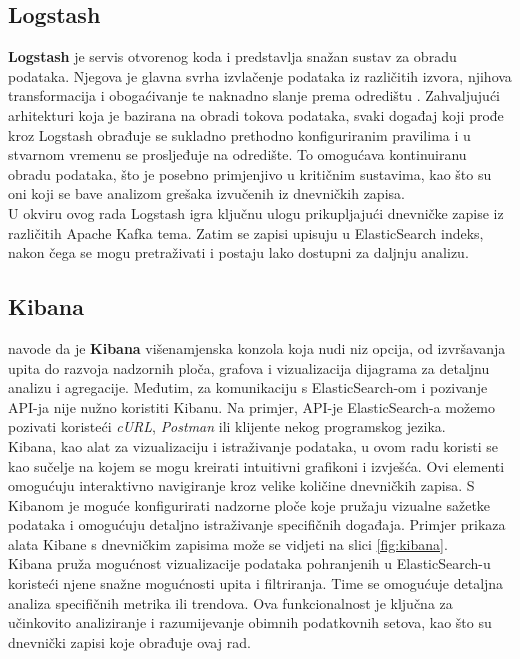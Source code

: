 \documentclass[times, utf8, diplomski]{fer}
\begin{document}
\subsection{Logstash}
\label{sec:logstash}

\textbf{Logstash} je servis otvorenog koda i predstavlja snažan sustav za obradu podataka. Njegova je glavna svrha izvlačenje podataka iz različitih izvora, njihova transformacija i obogaćivanje te naknadno slanje prema odredištu \citep{konda_elasticsearch_2023}. Zahvaljujući arhitekturi koja je bazirana na obradi tokova podataka, svaki događaj koji prođe kroz Logstash obrađuje se sukladno prethodno konfiguriranim pravilima i u stvarnom vremenu se prosljeđuje na odredište. To omogućava kontinuiranu obradu podataka, što je posebno primjenjivo u kritičnim sustavima, kao što su oni koji se bave analizom grešaka izvučenih iz dnevničkih zapisa.\\

U okviru ovog rada Logstash igra ključnu ulogu prikupljajući dnevničke zapise iz različitih Apache Kafka tema. Zatim se zapisi upisuju u ElasticSearch indeks, nakon čega se mogu pretraživati i postaju lako dostupni za daljnju analizu.

\subsection{Kibana}
\label{sec:kibana}

\citet{gormley_elasticsearch_2015} navode da je \textbf{Kibana} višenamjenska konzola koja nudi niz opcija, od izvršavanja upita do razvoja nadzornih ploča, grafova i vizualizacija dijagrama za detaljnu analizu i agregacije. Međutim, za komunikaciju s ElasticSearch-om i pozivanje API-ja nije nužno koristiti Kibanu. Na primjer, API-je ElasticSearch-a možemo pozivati koristeći \emph{cURL}, \emph{Postman} ili klijente nekog programskog jezika.\\

Kibana, kao alat za vizualizaciju i istraživanje podataka, u ovom radu koristi se kao sučelje na kojem se mogu kreirati intuitivni grafikoni i izvješća. Ovi elementi omogućuju interaktivno navigiranje kroz velike količine dnevničkih zapisa. S Kibanom je moguće konfigurirati nadzorne ploče koje pružaju vizualne sažetke podataka i omogućuju detaljno istraživanje specifičnih događaja. Primjer prikaza alata Kibane s dnevničkim zapisima može se vidjeti na slici \ref{fig:kibana}.\\

Kibana pruža mogućnost vizualizacije podataka pohranjenih u ElasticSearch-u koristeći njene snažne mogućnosti upita i filtriranja. Time se omogućuje detaljna analiza specifičnih metrika ili trendova. Ova funkcionalnost je ključna za učinkovito analiziranje i razumijevanje obimnih podatkovnih setova, kao što su dnevnički zapisi koje obrađuje ovaj rad.
\end{document}
